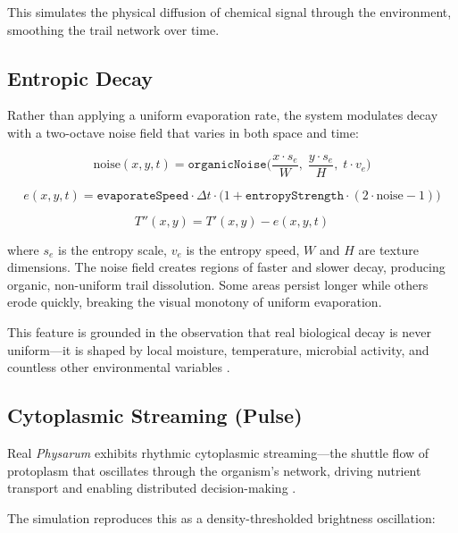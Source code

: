 \documentclass[12pt, titlepage]{article}
\begin{document}
This simulates the physical diffusion of chemical signal through the
environment, smoothing the trail network over time.

\subsection{Entropic Decay}
\label{sec:entropy}

Rather than applying a uniform evaporation rate, the system modulates decay
with a two-octave noise field that varies in both space and time:

\begin{equation}
    \text{noise}(x,y,t) = \texttt{organicNoise}\Big(\frac{x \cdot
    s_e}{W},\;\frac{y \cdot s_e}{H},\; t \cdot v_e\Big)
\end{equation}

\begin{equation}
    e(x,y,t) = \texttt{evaporateSpeed} \cdot \Delta t \cdot
    \big(1 + \texttt{entropyStrength} \cdot (2 \cdot \text{noise} - 1)\big)
\end{equation}

\begin{equation}
    T''(x,y) = T'(x,y) - e(x,y,t)
\end{equation}

where $s_e$ is the entropy scale, $v_e$ is the entropy speed, $W$ and $H$ are
texture dimensions. The noise field creates regions of faster and slower decay,
producing organic, non-uniform trail dissolution. Some areas persist longer
while others erode quickly, breaking the visual monotony of uniform evaporation.

This feature is grounded in the observation that real biological decay is never
uniform---it is shaped by local moisture, temperature, microbial activity, and
countless other environmental variables \cite{bunton2025}.

\subsection{Cytoplasmic Streaming (Pulse)}
\label{sec:pulse}

Real \textit{Physarum} exhibits rhythmic cytoplasmic streaming---the
shuttle flow of protoplasm that oscillates through the organism's network, driving
nutrient transport and enabling distributed decision-making \cite{adamatzky2014}.

The simulation reproduces this as a density-thresholded brightness oscillation:
\end{document}
